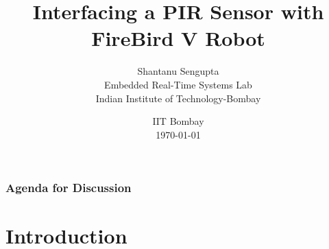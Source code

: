 \documentclass[table,10pt,red]{beamer}	%
\title
[
	e-Yantra	%
	\hspace{0.5cm}
	\insertframenumber/\inserttotalframenumber
]
{
	Interfacing a PIR Sensor with FireBird V Robot
}
\author
[
	www.e-yantra.org 	%
]
{
	Shantanu Sengupta \\
\vspace{5mm}
  Embedded Real-Time Systems Lab\\
  Indian Institute of Technology-Bombay \\
}
\date
{
IIT Bombay \\ {\today}	%
}
\begin{document}

\begin{frame}	%
	\titlepage %
\end{frame}

\begin{frame}
	\frametitle{Agenda for Discussion} %
	\tableofcontents %
\end{frame}


\section{Introduction} %
\end{document}

